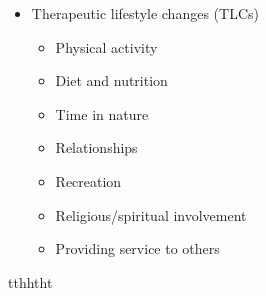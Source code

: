 \begin{itemize}
    \item Therapeutic lifestyle changes (TLCs)
    \begin{itemize}
        \item Physical activity
        \item Diet and nutrition
        \item Time in nature
        \item Relationships
        \item Recreation
        \item Religious/spiritual involvement
        \item Providing service to others
    \end{itemize}
\end{itemize}

tthhtht